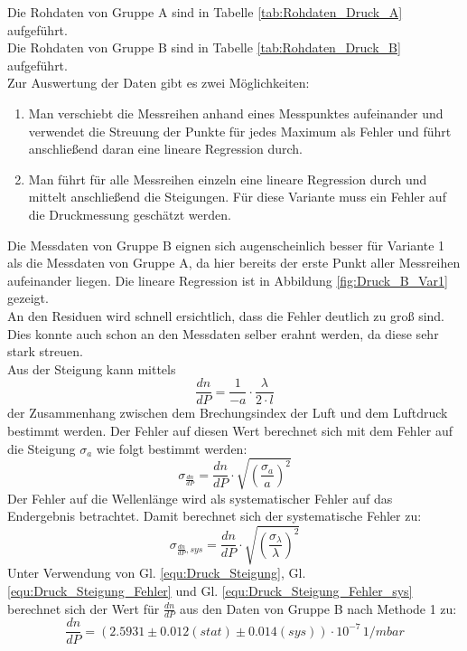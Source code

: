 \documentclass[12pt,a4paper]{article}
\begin{document}
Die Rohdaten von Gruppe A sind in Tabelle \ref{tab:Rohdaten_Druck_A} aufgeführt.\\
Die Rohdaten von Gruppe B sind in Tabelle \ref{tab:Rohdaten_Druck_B} aufgeführt.\\
Zur Auswertung der Daten gibt es zwei Möglichkeiten:
\begin{enumerate}
\item Man verschiebt die Messreihen anhand eines Messpunktes aufeinander und verwendet die Streuung der Punkte für jedes Maximum als Fehler und führt anschließend daran eine lineare Regression durch. 
\item Man führt für alle Messreihen einzeln eine lineare Regression durch und mittelt anschließend die Steigungen. Für diese Variante muss ein Fehler auf die Druckmessung geschätzt werden.
\end{enumerate}
Die Messdaten von Gruppe B eignen sich augenscheinlich besser für Variante 1 als die Messdaten von Gruppe A, da hier bereits der erste Punkt aller Messreihen aufeinander liegen. Die lineare Regression ist in Abbildung \ref{fig:Druck_B_Var1} gezeigt. \\
An den Residuen wird schnell ersichtlich, dass die Fehler deutlich zu groß sind. Dies konnte auch schon an den Messdaten selber erahnt werden, da diese sehr stark streuen.\\
Aus der Steigung kann mittels 
\begin{equation}
\dfrac{dn}{dP} = \dfrac{1}{-a} \cdot \dfrac{\lambda}{2 \cdot l}
\label{equ:Druck_Steigung}
\end{equation}
der Zusammenhang zwischen dem Brechungsindex der Luft und dem Luftdruck bestimmt werden. Der Fehler auf diesen Wert berechnet sich mit dem Fehler auf die Steigung $\sigma _a$ wie folgt bestimmt werden:
\begin{equation}
\sigma _{\frac{dn}{dP}} = \dfrac{dn}{dP} \cdot \sqrt{\left( \dfrac{\sigma_ a}{a} \right) ^2}
\label{equ:Druck_Steigung_Fehler}
\end{equation}
Der Fehler auf die Wellenlänge wird als systematischer Fehler auf das Endergebnis betrachtet. Damit berechnet sich der systematische Fehler zu:
\begin{equation}
\sigma _{\frac{dn}{dP}, sys} = \dfrac{dn}{dP} \cdot \sqrt{\left( \dfrac{\sigma_ \lambda}{\lambda} \right) ^2}
\label{equ:Druck_Steigung_Fehler_sys}
\end{equation}
Unter Verwendung von Gl. \ref{equ:Druck_Steigung}, Gl. \ref{equ:Druck_Steigung_Fehler} und Gl. \ref{equ:Druck_Steigung_Fehler_sys} berechnet sich der Wert für $\frac{dn}{dP}$ aus den Daten von Gruppe B nach Methode 1 zu:
\begin{equation*}
\dfrac{dn}{dP} = (2.5931 \pm 0.012 (stat) \pm 0.014 (sys)) \cdot 10^{-7} \, \si{1/mbar}
\end{equation*}
\end{document}
